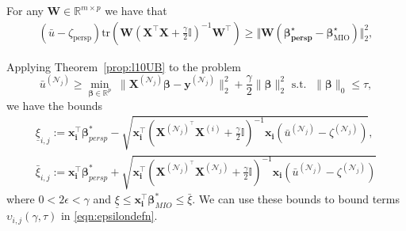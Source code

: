 \documentclass[mnsc,nonblindrev]{informs3} %
\newcommand{\ag}[1]{{\color{black}#1}}
\begin{document}
\begin{corollary}
    For any $\bm{W} \in \mathbb{R}^{m \times p}$ we have that
 \begin{align*}
     (\bar{u}-\zeta_{\text{persp}}) \mathrm{tr}\left(\bm{W} \left(\bm{X}^\top \bm{X}+\frac{\gamma}{2} \bm{\mathbb{I}}\right)^{-1} \bm{W}^\top\right)\geq \Vert 
     \bm{W}(\bm{\beta^\star_{\text{persp}}}- \bm{\beta}^\star_{\text{MIO}})\Vert_2^2,
 \end{align*}
\end{corollary}


Applying Theorem~\ref{prop:l10UB} to the problem 
$$	\bar u^{(\mathcal{N}_j)}\geq \min_{\bm{\beta}\in \mathbb{R}^p}\; \|\bm{X}^{(\mathcal{N}_j)}\bm{\beta}-\bm{y}^{(\mathcal{N}_j)}\|_2^2+\frac{\gamma}{2}\|\bm{\beta}\|_2^2
\text{ s.t. }\; \|\bm{\beta}\|_0\leq \tau,$$  we have the bounds
\begin{align*}
	\underline{\xi}_{i,j}:=\bm{x_i^\top}\bm{\beta}_{persp}^*-\sqrt{\bm{x_i^\top}\left(\bm{X}^{(\mathcal{N}_j)^\top} \bm{X}^{(i)}+\frac{\gamma}{2}\mathbb{I}\right)^{-1}\bm{x_i}\left(\bar u^{(\mathcal{N}_j)}-\zeta^{(\mathcal{N}_j)}\right)},\\
	\bar{\xi}_{i,j}:=\bm{x_i^\top}\bm{\beta}_{persp}^*+\sqrt{\bm{x_i^\top}\left(\bm{X}^{(\mathcal{N}_j)^\top} \bm{X}^{(\mathcal{N}_j)}+\frac{\gamma}{2}\mathbb{I}\right)^{-1}\bm{x_i}\left(\bar u^{(\mathcal{N}_j)}-\zeta^{(\mathcal{N}_j)}\right)}
\end{align*}
where $0 < 2\epsilon < \gamma$ and $\underline{\xi}\leq \bm{x_i^\top}\bm{\beta}_{MIO}^*\leq \bar\xi$. We can use these bounds to bound \ag{terms $\upsilon_{i,j}(\gamma,\tau)$ in \eqref{eqn:epsilondefn}}.
\end{document}
